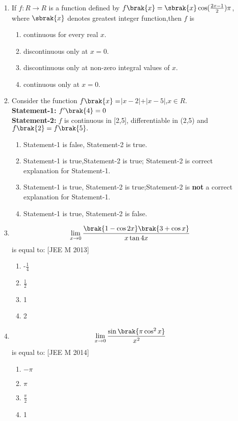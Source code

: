 \documentclass[journal,12pt,onecolumn]{IEEEtran}
\theoremstyle{remark}
\begin{document}
\begin{enumerate}
    \item If $f:R\to R$ is a function defined by $f\brak{x}=\sbrak{x} \cos (\frac{2x-1}{2})\pi$, where $\sbrak{x}$ denotes greatest integer function,then $f$ is \hfill{}
     \begin{enumerate}
     \item continuous for every real $x$. \item discontinuous only at $x=0$. \item discontinuous only at non-zero integral values of $x$. \item continuous only at $x=0$.
     \end{enumerate}
    \item Consider the function $f\brak{x}=$\(\lvert x-2\rvert\)+\(\lvert x-5\rvert\),$x\in R$.\\ \textbf{Statement-1:} $f'\brak{4}=0$\\ \textbf{Statement-2:} $f$ is continuous in [2,5], differentiable in (2,5) and $f\brak{2}=f\brak{5}.$ \hfill{}
     \begin{enumerate}
     \item Statement-1 is false, Statement-2 is true. \item Statement-1 is true,Statement-2 is true; Statement-2 is correct explanation for Statement-1. \item Statement-1 is true, Statement-2 is true;Statement-2 is \textbf{not} a correct explanation for Statement-1. \item Statement-1 is true, Statement-2 is false.
     \end{enumerate}
    \item 
        \[ \lim_{x \to 0} \frac{\brak{1-\cos2x}\brak{3+\cos x}}{x\tan4x} \]is equal to: \hfill[JEE M 2013]
     \begin{multicols}{4}
         \begin{enumerate}
     \item -$\frac{1}{4}$ \item $\frac{1}{2}$  \item1 \item2 
     \end{enumerate}
     \end{multicols}
     
    \item 
        \[ \lim_{x \to 0} \frac{\sin\brak{\pi\cos^{2}x}}{x^2}\] is equal to: \hfill[JEE M 2014]
     \begin{multicols}{4}
        \begin{enumerate}
     \item $-\pi$ \item $\pi$ \item $\frac{\pi}{2}$ \item 1 
     \end{enumerate} 
     \end{multicols}
     

\end{enumerate}
\end{document}
